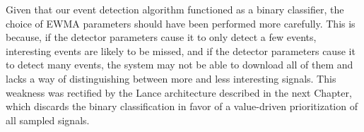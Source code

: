 \vfill\eject

Given that our event detection algorithm functioned as a binary classifier,
the choice of EWMA parameters should have been performed more carefully. This
is because, if the detector parameters cause it to only detect a few events,
interesting events are likely to be missed, and if the detector parameters
cause it to detect many events, the system may not be able to download all of
them and lacks a way of distinguishing between more and less interesting
signals. This weakness was rectified by the Lance architecture described in
the next Chapter, which discards the binary classification in favor of a
value-driven prioritization of all sampled signals.
